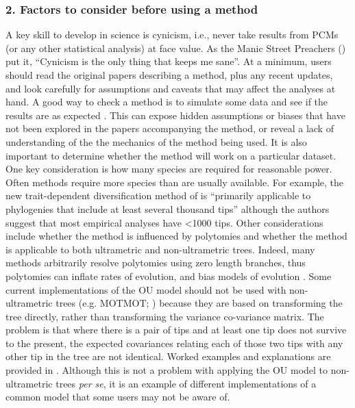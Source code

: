 \documentclass[a4paper,12pt]{article}
\begin{document}
  \subsubsection{2. Factors to consider before using a method}
    A key skill to develop in science is cynicism, i.e., never take results from PCMs (or any other statistical analysis) at face value.
    As the Manic Street Preachers (\citeyear{manics}) put it, ``Cynicism is the only thing that keeps me sane''.
    At a minimum, users should read the original papers describing a method, plus any recent updates, and look carefully for assumptions and caveats that may affect the analyses at hand.
    A good way to check a method is to simulate some data and see if the results are as expected \citep[e.g.][]{boettiger2012your}. 
    This can expose hidden assumptions or biases that have not been explored in the papers accompanying the method, or reveal a lack of understanding of the the mechanics of the method being used. 
    It is also important to determine whether the method will work on a particular dataset.
    One key consideration is how many species are required for reasonable power. 
    Often methods require more species than are usually available. For example, the new trait-dependent diversification method of \citet{rabosky2015robust} is ``primarily applicable to phylogenies that include at least several thousand tips'' although the authors suggest that most empirical analyses have \textless 1000 tips. 
    Other considerations include whether the method is influenced by polytomies and whether the method is applicable to both ultrametric and non-ultrametric trees. 
    Indeed, many methods arbitrarily resolve polytomies using zero length branches, thus polytomies can inflate rates of evolution, and bias models of evolution  \citep{cooper2010body}. 
    Some current implementations of the OU model should not be used with non-ultrametric trees (e.g. MOTMOT; \citealp{Thomas:2011aa}) because they are based on transforming the tree directly, rather than transforming the variance co-variance matrix. 
    The problem is that where there is a pair of tips and at least one tip does not survive to the present, the expected covariances relating each of those two tips with any other tip in the tree are not identical. 
    Worked examples and explanations are provided in \citep{slater2014correction}. 
    Although this is not a problem with applying the OU model to non-ultrametric trees \textit{per se}, it is an example of different implementations of a common model that some users may not be aware of. 
\end{document}
